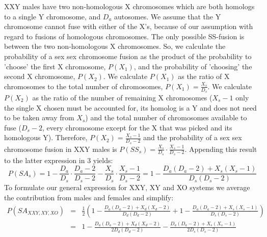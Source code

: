 \documentclass[12pt]{article}
\begin{document}
XXY males have two non-homologous X chromosomes which are both homologs to a single Y chromosome, and $D_a$ autosomes. 
We assume that the Y chromosome cannot fuse with either of the X's, because of our assumption with regard to fusions of homologous chromosomes. %
The only possible SS-fusion is between the two non-homologous X chromosomes. 
So, we calculate the probability of a sex sex chromosome fusion as the product of the probability to 'choose' the first X chromosome, $P(X_1) $, and the probability of 'choosing' the second X chromosome, $P(X_2) $. 
We calculate $P(X_1) $ as the ratio of X chromosomes to the total number of chromosomes, $P(X_1) = \frac{X_s}{D_s} $.
We calculate $P(X_2) $ as the ratio of the number of remaining X chromosomes ($X_s - 1 $ only the single X chosen must be accounted for, its homolog is a Y and does not need to be taken away from $X_s $) and the total number of chromosomes available to fuse ($D_s - 2 $, every chromosome except for the X that was picked and its homologous Y).  
Therefore, $P(X_2) = \frac{X_s - 1}{D_s - 2} $ and the probability of a sex sex chromosome fusion in XXY males is $P(SS_s) = \frac{X_s}{D_s} \cdot \frac{X_s - 1}{D_s - 2}$.
Appending this result to the latter expression in 3 yields:
    \begin{equation}
        P(SA_s) = 1 - \frac{D_a}{D_s} \cdot \frac{D_a - 2}{D_s - 2} - \frac{X_s}{D_s} \cdot \frac{X_s - 1}{D_s - 2} = 1 - \frac{D_a(D_a - 2) + X_s(X_s-1)}{D_s(D_s-2)}
    \end{equation}
To formulate our general expression for XXY, XY and XO systems we average the contribution from males and females and simplify:
\begin{equation}
\begin{array}{rcl}
P(SA_{XXY, XY, XO}) & = & \frac{1}{2} (1 - \frac{D_a(D_a-2) + X_d(X_d-2)}{D_d(D_d-2)} + 1 - \frac{D_a(D_a - 2) + X_s(X_s-1)}{D_s(D_s-2)}) \\
& = & 1 -\frac{D_a(D_a-2) + X_d(X_d-2)}{2D_d(D_d-2)} - \frac{D_a(D_a - 2) + X_s(X_s-1)}{2D_s(D_s-2)}
\end{array}
\end{equation}
\end{document}
